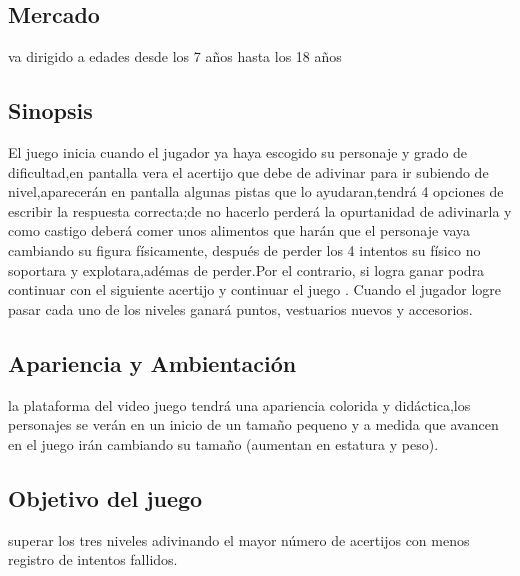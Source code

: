 \documentclass{article}
\begin{document}
\subsection{Mercado}
%
va dirigido a edades desde los 7 años hasta los 18 años


\subsection{Sinopsis}
%
El juego inicia cuando el jugador ya haya escogido su personaje y grado de dificultad,en pantalla vera el acertijo que debe de adivinar para ir subiendo de nivel,aparecerán en pantalla algunas pistas  que lo ayudaran,tendrá 4 opciones de escribir la respuesta correcta;de no hacerlo perderá la opurtanidad de adivinarla y como castigo deberá comer unos alimentos que harán que el personaje vaya cambiando su figura físicamente, después de perder los 4 intentos su físico no soportara y explotara,adémas de perder.Por el contrario, si logra ganar podra continuar con el siguiente acertijo y continuar el juego . Cuando el jugador logre pasar cada uno de los niveles ganará puntos, vestuarios nuevos y accesorios.  

\subsection{Apariencia y Ambientación}
%
la plataforma del video juego tendrá una apariencia colorida y didáctica,los personajes se verán en un inicio de un tamaño pequeno y a medida que avancen en el juego irán cambiando su tamaño (aumentan en estatura y peso).

\subsection{Objetivo del juego}
%
superar los tres niveles adivinando el mayor número de acertijos con menos registro de intentos fallidos.
\end{document}
